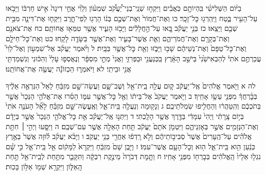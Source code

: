 \documentclass[twoside, openany, parskip=half, 11pt]{book}
\begin{document}
בַיּ֨וֹם הַשְּׁלִישִׁ֜י בִּֽהְיוֹתָ֣ם כֹּֽאֲבִ֗ים וַיִּקְח֣וּ שְׁנֵֽי־בְנֵי־יַ֠עֲקֹ֠ב שִׁמְע֨וֹן וְלֵוִ֜י אֲחֵ֤י דִינָה֙ אִ֣ישׁ חַרְבּ֔וֹ וַיָּבֹ֥אוּ עַל־הָעִ֖יר בֶּ֑טַח וַיַּֽהַרְג֖וּ כׇּל־זָכָֽר׃ כו וְאֶת־חֲמוֹר֙ וְאֶת־שְׁכֶ֣ם בְּנ֔וֹ הָרְג֖וּ לְפִי־חָ֑רֶב וַיִּקְח֧וּ אֶת־דִּינָ֛ה מִבֵּ֥ית שְׁכֶ֖ם וַיֵּצֵֽאוּ׃ כז בְּנֵ֣י יַעֲקֹ֗ב בָּ֚אוּ עַל־הַ֣חֲלָלִ֔ים וַיָּבֹ֖זּוּ הָעִ֑יר אֲשֶׁ֥ר טִמְּא֖וּ אֲחוֹתָֽם׃ כח אֶת־צֹאנָ֥ם וְאֶת־בְּקָרָ֖ם וְאֶת־חֲמֹרֵיהֶ֑ם וְאֵ֧ת אֲשֶׁר־בָּעִ֛יר וְאֶת־אֲשֶׁ֥ר בַּשָּׂדֶ֖ה לָקָֽחוּ׃ כט וְאֶת־כׇּל־חֵילָ֤ם וְאֶת־כׇּל־טַפָּם֙ וְאֶת־נְשֵׁיהֶ֔ם שָׁב֖וּ וַיָּבֹ֑זּוּ וְאֵ֖ת כׇּל־אֲשֶׁ֥ר בַּבָּֽיִת׃ ל וַיֹּ֨אמֶר יַעֲקֹ֜ב אֶל־שִׁמְע֣וֹן וְאֶל־לֵוִי֮ עֲכַרְתֶּ֣ם אֹתִי֒ לְהַבְאִישֵׁ֙נִי֙ בְּיֹשֵׁ֣ב הָאָ֔רֶץ בַּֽכְּנַעֲנִ֖י וּבַפְּרִזִּ֑י וַאֲנִי֙ מְתֵ֣י מִסְפָּ֔ר וְנֶאֶסְפ֤וּ עָלַי֙ וְהִכּ֔וּנִי וְנִשְׁמַדְתִּ֖י אֲנִ֥י וּבֵיתִֽי׃ לא וַיֹּאמְר֑וּ הַכְזוֹנָ֕ה יַעֲשֶׂ֖ה אֶת־אֲחוֹתֵֽנוּ׃

לה א וַיֹּ֤אמֶר אֱלֹהִים֙ אֶֽל־יַעֲקֹ֔ב ק֛וּם עֲלֵ֥ה בֵֽית־אֵ֖ל וְשֶׁב־שָׁ֑ם וַעֲשֵׂה־שָׁ֣ם מִזְבֵּ֔חַ לָאֵל֙ הַנִּרְאֶ֣ה אֵלֶ֔יךָ בְּבׇ֨רְחֲךָ֔ מִפְּנֵ֖י עֵשָׂ֥ו אָחִֽיךָ׃ ב וַיֹּ֤אמֶר יַעֲקֹב֙ אֶל־בֵּית֔וֹ וְאֶ֖ל כׇּל־אֲשֶׁ֣ר עִמּ֑וֹ הָסִ֜רוּ אֶת־אֱלֹהֵ֤י הַנֵּכָר֙ אֲשֶׁ֣ר בְּתֹכְכֶ֔ם וְהִֽטַּהֲר֔וּ וְהַחֲלִ֖יפוּ שִׂמְלֹתֵיכֶֽם׃ ג וְנָק֥וּמָה וְנַעֲלֶ֖ה בֵּֽית־אֵ֑ל וְאֶֽעֱשֶׂה־שָּׁ֣ם מִזְבֵּ֗חַ לָאֵ֞ל הָעֹנֶ֤ה אֹתִי֙ בְּי֣וֹם צָֽרָתִ֔י וַיְהִי֙ עִמָּדִ֔י בַּדֶּ֖רֶךְ אֲשֶׁ֥ר הָלָֽכְתִּי׃ ד וַיִּתְּנ֣וּ אֶֽל־יַעֲקֹ֗ב אֵ֣ת כׇּל־אֱלֹהֵ֤י הַנֵּכָר֙ אֲשֶׁ֣ר בְּיָדָ֔ם וְאֶת־הַנְּזָמִ֖ים אֲשֶׁ֣ר בְּאׇזְנֵיהֶ֑ם וַיִּטְמֹ֤ן אֹתָם֙ יַעֲקֹ֔ב תַּ֥חַת הָאֵלָ֖ה אֲשֶׁ֥ר עִם־שְׁכֶֽם׃ ה וַיִּסָּ֑עוּ וַיְהִ֣י ׀ חִתַּ֣ת אֱלֹהִ֗ים עַל־הֶֽעָרִים֙ אֲשֶׁר֙ סְבִיב֣וֹתֵיהֶ֔ם וְלֹ֣א רָֽדְפ֔וּ אַחֲרֵ֖י בְּנֵ֥י יַעֲקֹֽב׃ ו וַיָּבֹ֨א יַעֲקֹ֜ב ל֗וּזָה אֲשֶׁר֙ בְּאֶ֣רֶץ כְּנַ֔עַן הִ֖וא בֵּֽית־אֵ֑ל ה֖וּא וְכׇל־הָעָ֥ם אֲשֶׁר־עִמּֽוֹ׃ ז וַיִּ֤בֶן שָׁם֙ מִזְבֵּ֔חַ וַיִּקְרָא֙ לַמָּק֔וֹם אֵ֖ל בֵּֽית־אֵ֑ל כִּ֣י שָׁ֗ם נִגְל֤וּ אֵלָיו֙ הָֽאֱלֹהִ֔ים בְּבׇרְח֖וֹ מִפְּנֵ֥י אָחִֽיו׃ ח וַתָּ֤מׇת דְּבֹרָה֙ מֵינֶ֣קֶת רִבְקָ֔ה וַתִּקָּבֵ֛ר מִתַּ֥חַת לְבֵֽית־אֵ֖ל תַּ֣חַת הָֽאַלּ֑וֹן וַיִּקְרָ֥א שְׁמ֖וֹ אַלּ֥וֹן בָּכֽוּת׃
\end{document}
